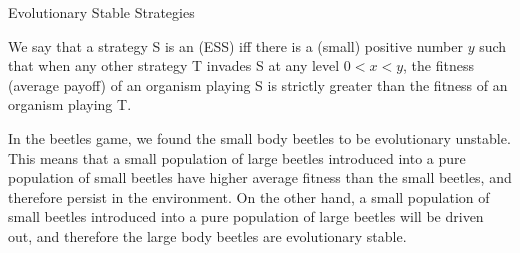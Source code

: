 \documentclass{article}
\begin{document}
\begin{ssection}{Evolutionary Stable Strategies}
	\begin{definition}
		We say that a strategy S is an  (ESS) iff there is a (small) positive number $y$ such that when any other strategy T invades S at any level $0 < x < y$, the fitness (average payoff) of an organism playing S is strictly greater than the fitness of an organism playing T.
		\label{def:ess}
	\end{definition}

	In the beetles game, we found the small body beetles to be evolutionary unstable. This means that a small population of large beetles introduced into a pure population of small beetles have higher average fitness than the small beetles, and therefore persist in the environment. On the other hand, a small population of small beetles introduced into a pure population of large beetles will be driven out, and therefore the large body beetles are evolutionary stable.

\end{ssection}
\end{document}
